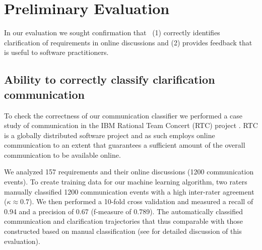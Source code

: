 \section{Preliminary Evaluation}
In our evaluation we sought confirmation that \viss\ (1) correctly identifies clarification of requirements in online discussions and (2) provides feedback that is useful to software practitioners. 

\subsection{Ability to correctly classify clarification communication}
To check the correctness of our communication classifier we performed a case study of communication in the IBM Rational Team Concert (RTC) project \cite{Knauss2012f}. RTC is a globally distributed software project and as such employs online communication to an extent that guarantees a sufficient amount of the overall communication to be available online.



We analyzed 157 requirements and their online discussions (1200 communication events). To create training data for our machine learning algorithm, two raters manually classified 1200 communication events with a high inter-rater agreement ($\kappa \approx 0.7$).  
We then performed a 10-fold cross validation and measured a recall of 0.94 and a precision of  0.67 (f-measure of 0.789). The automatically classified communication and clarification trajectories that thus comparable with those constructed based on manual classification (see \cite{Knauss2012f} for detailed discussion of this evaluation).


